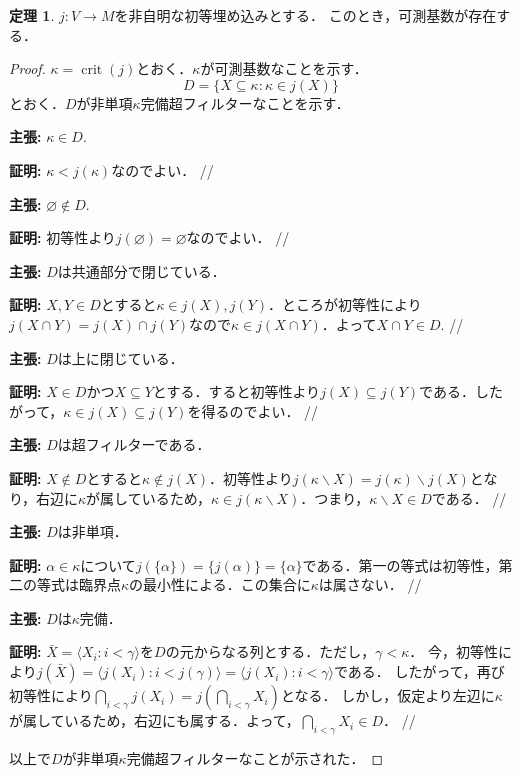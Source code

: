 \documentclass[uplatex]{jsarticle}
\newcommand{\crit}{\operatorname{crit}}
\newcommand{\seq}[1]{{\langle#1\rangle}}
\renewcommand\emptyset{\varnothing}
\renewcommand\subset{\subseteq}
\renewcommand{\setminus}{\smallsetminus}
\theoremstyle{definition}
\newtheorem{thm}{定理}[section]
\begin{document}
	\begin{thm}
		$j \colon V \to M$を非自明な初等埋め込みとする．
		このとき，可測基数が存在する．
	\end{thm}
	\begin{proof}
		$\kappa = \crit(j)$とおく．$\kappa$が可測基数なことを示す．
		\[
		D = \{ X \subset \kappa : \kappa \in j(X) \}
		\]
		とおく．$D$が非単項$\kappa$完備超フィルターなことを示す．
		
		\par \textbf{主張: } $\kappa \in D$.
		\par \textbf{証明: } $\kappa < j(\kappa)$なのでよい． \hfill //
		
		\par \textbf{主張: } $\emptyset\not \in D$.
		\par \textbf{証明: } 初等性より$j(\emptyset) = \emptyset$なのでよい． \hfill //
		
		\par \textbf{主張: } $D$は共通部分で閉じている．
		\par \textbf{証明: } $X, Y \in D$とすると$\kappa \in j(X), j(Y)$．ところが初等性により$j(X \cap Y) = j(X) \cap j(Y)$なので$\kappa \in j(X \cap Y)$．よって$X \cap Y \in D$. \hfill //
		
		\par \textbf{主張: } $D$は上に閉じている．
		\par \textbf{証明: } $X \in D$かつ$X \subset Y$とする．すると初等性より$j(X) \subset j(Y)$である．したがって，$\kappa \in j(X) \subset j(Y)$を得るのでよい． \hfill //
		
		\par \textbf{主張: } $D$は超フィルターである．
		\par \textbf{証明: } $X \not \in D$とすると$\kappa \not \in j(X)$．初等性より$j(\kappa \setminus X) = j(\kappa) \setminus j(X)$となり，右辺に$\kappa$が属しているため，$\kappa \in j(\kappa \setminus X)$．つまり，$\kappa \setminus X \in D$である． \hfill //
		
		\par \textbf{主張: } $D$は非単項．
		\par \textbf{証明: } 	$\alpha \in \kappa$について$j(\{\alpha\}) = \{j(\alpha)\} = \{\alpha\}$である．第一の等式は初等性，第二の等式は臨界点$\kappa$の最小性による．この集合に$\kappa$は属さない． \hfill //
		
		\par \textbf{主張: } $D$は$\kappa$完備．
		\par \textbf{証明: } 	$\bar{X} = \seq{X_i : i < \gamma }$を$D$の元からなる列とする．ただし，$\gamma < \kappa$．
		今，初等性により$j(\bar{X}) = \seq{j(X_i) : i < j(\gamma)} = \seq{j(X_i) : i < \gamma}$である．
		したがって，再び初等性により$\bigcap_{i < \gamma} j(X_i) = j(\bigcap_{i < \gamma} X_i)$となる．
		しかし，仮定より左辺に$\kappa$が属しているため，右辺にも属する．よって，$\bigcap_{i < \gamma} X_i \in D$． \hfill //
		
		\par 以上で$D$が非単項$\kappa$完備超フィルターなことが示された．
		
	\end{proof}
	
\end{document}
